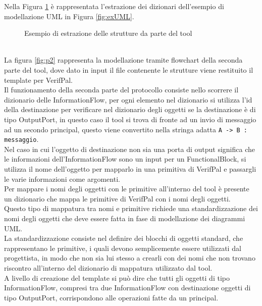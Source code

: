\clearpage
\noindent Nella Figura \ref{fig:exex} è rappresentata l'estrazione dei dizionari dell'esempio di modellazione UML in Figura \ref{fig:exUML}.\\
\begin{figure} [h!]
    
    \caption{Esempio di estrazione delle strutture da parte del tool}
    \label{fig:exex}
\end{figure}
\\
\noindent La figura \ref{fig:p2} rappresenta la modellazione tramite flowchart della seconda parte del tool, dove dato in input il file contenente le strutture viene restituito il template per VerifPal.\\
Il funzionamento della seconda parte del protocollo consiste nello scorrere il dizionario delle InformationFlow, per ogni elemento nel dizionario si utilizza l'id della destinazione per verificare nel dizionario degli oggetti se la destinazione è di tipo OutputPort, in questo caso il tool si trova di fronte ad un invio di messaggio ad un secondo principal, questo viene convertito nella stringa adatta \texttt{A -> B : messaggio}.\\
Nel caso in cui l'oggetto di destinazione non sia una porta di output significa che le informazioni dell'InformationFlow sono un input per un FunctionalBlock, si utilizza il nome dell'oggetto per mapparlo in una primitiva di VerifPal e passargli le varie informazioni come argomenti.\\ 
Per mappare i nomi degli oggetti con le primitive all'interno del tool è presente un dizionario che mappa le primitive di VerifPal con i nomi degli oggetti.\\
Questo tipo di mappatura tra nomi e primitive richiede una standardizzazione dei nomi degli oggetti che deve essere fatta in fase di modellazione dei diagrammi UML. \\
La standardizzazione consiste nel definire dei blocchi di oggetti standard, che rappresentano le primitive, i quali devono semplicemente essere utilizzati dal progettista, in modo che non sia lui stesso a crearli con dei nomi che non trovano riscontro all'interno del dizionario di mappatura utilizzato dal tool.\\
A livello di creazione del template si può dire che tutti gli oggetti di tipo InformationFlow, compresi tra due InformationFlow con destinazione oggetti di tipo OutputPort, corrispondono alle operazioni fatte da un principal.\\
